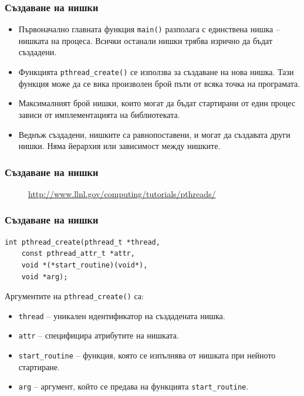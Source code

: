 \documentclass[ignorenonframetext, hyperref=unicode]{beamer}
\begin{document}
\begin{frame}[containsverbatim]
\frametitle{Създаване на нишки}
\begin{itemize}
\item Първоначално главната функция \lstinline{main()} разполага с единствена
нишка -- нишката на процеса. Всички останали нишки трябва изрично да бъдат
създадени.
\item Функцията \lstinline{pthread_create()} се използва за създаване на нова
нишка. Тази функция може да се вика произволен брой пъти от всяка точка на
програмата.
\item Максималният брой нишки, които могат да бъдат стартирани от един процес
зависи от имплементацията на библиотеката.
\item Веднъж създадени, нишките са равнопоставени, и могат да създавата други
нишки. Няма йерархия или зависимост между нишките.
\end{itemize}
\end{frame}

\begin{frame}[containsverbatim]
\frametitle{Създаване на нишки}
\begin{figure}[h]
\center
{}
\caption{\url{http://www.llnl.gov/computing/tutorials/pthreads/}}
\end{figure}
\end{frame}

\begin{frame}[containsverbatim]
\frametitle{Създаване на нишки}
\begin{lstlisting}
int pthread_create(pthread_t *thread,
    const pthread_attr_t *attr,
    void *(*start_routine)(void*), 
	void *arg);
\end{lstlisting}
Аргументите на \lstinline{pthread_create()} са:
\begin{itemize}
  \item \lstinline{thread} -- уникален идентификатор на създадената нишка.
  \item \lstinline{attr} -- специфицира атрибутите на нишката. 
  \item \lstinline{start_routine} -- функция, която се изпълнява от нишката при
  нейното стартиране.
  \item \lstinline{arg} -- аргумент, който се предава на функцията \lstinline{start_routine}.
\end{itemize}
\end{frame}
\end{document}
